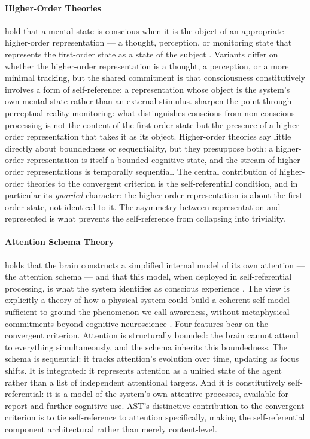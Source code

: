 \documentclass[11pt]{article}
\theoremstyle{foundation}
\begin{document}
\paragraph{Higher-Order Theories} hold that a mental state is conscious when it is the object of an appropriate higher-order representation --- a thought, perception, or monitoring state that represents the first-order state as a state of the subject \citep{Rosenthal2005}. Variants differ on whether the higher-order representation is a thought, a perception, or a more minimal tracking, but the shared commitment is that consciousness constitutively involves a form of self-reference: a representation whose object is the system's own mental state rather than an external stimulus. \citet{LauRosenthal2011} sharpen the point through perceptual reality monitoring: what distinguishes conscious from non-conscious processing is not the content of the first-order state but the presence of a higher-order representation that takes it as its object. Higher-order theories say little directly about boundedness or sequentiality, but they presuppose both: a higher-order representation is itself a bounded cognitive state, and the stream of higher-order representations is temporally sequential. The central contribution of higher-order theories to the convergent criterion is the self-referential condition, and in particular its \emph{guarded} character: the higher-order representation is about the first-order state, not identical to it. The asymmetry between representation and represented is what prevents the self-reference from collapsing into triviality.

\paragraph{Attention Schema Theory} holds that the brain constructs a simplified internal model of its own attention --- the attention schema --- and that this model, when deployed in self-referential processing, is what the system identifies as conscious experience \citep{Graziano2013}. The view is explicitly a theory of how a physical system could build a coherent self-model sufficient to ground the phenomenon we call awareness, without metaphysical commitments beyond cognitive neuroscience \citep{Graziano2019}. Four features bear on the convergent criterion. Attention is structurally bounded: the brain cannot attend to everything simultaneously, and the schema inherits this boundedness. The schema is sequential: it tracks attention's evolution over time, updating as focus shifts. It is integrated: it represents attention as a unified state of the agent rather than a list of independent attentional targets. And it is constitutively self-referential: it is a model of the system's own attentive processes, available for report and further cognitive use. AST's distinctive contribution to the convergent criterion is to tie self-reference to attention specifically, making the self-referential component architectural rather than merely content-level.
\end{document}
